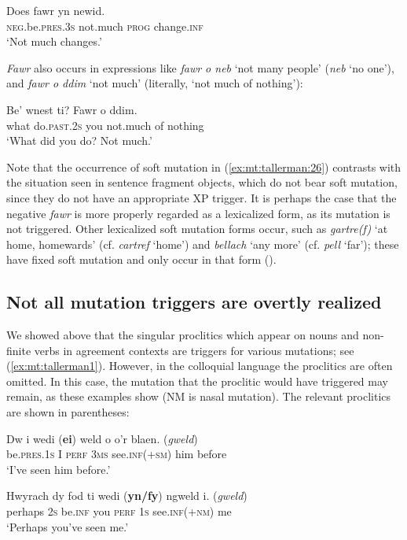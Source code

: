 \documentclass[output=paper,colorlinks,citecolor=brown]{langscibook}
\begin{document}
\ea\label{ex:mt:tallerman:25}
\gll Does fawr yn newid. \\
\textsc{neg.}be.\textsc{pres.3s} not.much \textsc{prog} change.\textsc{inf} \\
\glt ‘Not much changes.’
\z

{\textit{Fawr} }{also occurs in expressions like} {\textit{fawr o neb}}{ ‘not many people’ (}{\textit{neb} }{‘no one’), and} {\textit{fawr o ddim}}{ ‘not much’ (literally, ‘not much of nothing’):}

\ea\label{ex:mt:tallerman:26}
\gll Be’ wnest ti? Fawr o ddim. \\
what do.\textsc{past.2s} you not.much of nothing\\
\glt ‘What did you do? Not much.’
\z

{Note that the occurrence of soft mutation in (\ref{ex:mt:tallerman:26}) contrasts with the situation seen in sentence fragment objects, which do not bear soft mutation, since they do not have an appropriate XP trigger. It is perhaps the case that the negative} {\textit{fawr} }{is more properly regarded as a lexicalized form, as its mutation is not triggered. Other lexicalized soft mutation forms occur, such as} {\textit{gartre(f)}}{ ‘at home, homewards’ (cf.} {\textit{cartref} }{‘home’) and} {\textit{bellach} }{‘any more’ (cf.} {\textit{pell} }{‘far’); these have fixed soft mutation and only occur in that form (\citealt[257ff]{Morgan1952}).} 


\subsection{Not all mutation triggers are overtly realized}

We showed above that the singular proclitics which appear on nouns and non-finite verbs in agreement contexts are triggers for various mutations; see (\ref{ex:mt:tallerman1}). However, in the colloquial language the proclitics are often omitted. In this case, the mutation that the proclitic would have triggered may remain, as these examples show (NM is nasal mutation). The relevant proclitics are shown in parentheses:

\ea\label{ex:mt:tallerman:27}
\gll Dw i wedi (\textbf{ei}) weld    o {o’r blaen}.  (\textit{gweld})\\
be.\textsc{pres.1s} I \textsc{perf} \textsc{3ms} see.{\textsc{inf(+sm)}} him before\\
\glt ‘I’ve seen him before.’
\z

\ea\label{ex:mt:tallerman:28}
\gll Hwyrach dy fod ti wedi (\textbf{yn/fy}) ngweld i.   (\textit{gweld})\\
perhaps \textsc{2s} be.\textsc{inf} you \textsc{perf} \textsc{1s} see.\textsc{inf(+nm)} me\\
\glt  ‘Perhaps you’ve seen me.’
\z
\end{document}
